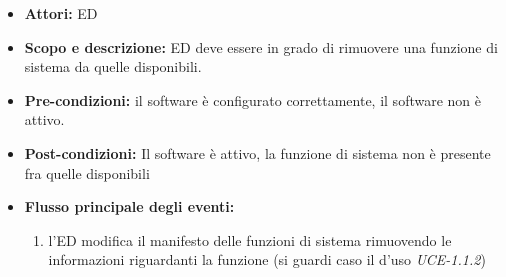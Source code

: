 \begin{itemize}
	\item \textbf{Attori:} ED
	\item \textbf{Scopo e descrizione:} ED deve essere in grado di rimuovere una funzione di sistema da quelle disponibili.
	\item \textbf{Pre-condizioni:} il software è configurato correttamente, il software non è attivo.
	\item \textbf{Post-condizioni:} Il software è attivo, la funzione di sistema non è presente fra quelle disponibili
	\item \textbf{Flusso principale degli eventi:}
		\begin{enumerate}
			\item l'ED modifica il manifesto delle funzioni di sistema rimuovendo le informazioni riguardanti la funzione (si guardi caso il d'uso \emph{UCE-1.1.2})
		\end{enumerate}
\end{itemize}

